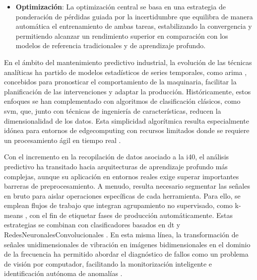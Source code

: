 \documentclass[IB]{TFUOC}
\begin{document}
\begin{itemize}
\begin{itemize}
                para realizar simultáneamente la predicción de la vida útil restante y la clasificación multietiqueta de
                fallos en equipos mecánicos a través de la captura de dependencias temporales y cruzadas entre sensores.
          \item \textbf{Optimización}: La optimización central se basa en una estrategia de ponderación de pérdidas
                guiada por la incertidumbre que equilibra de manera automática el entrenamiento de ambas tareas,
                estabilizando la convergencia y permitiendo alcanzar un rendimiento superior en comparación con los
                modelos de referencia tradicionales y de aprendizaje profundo.
        \end{itemize}
\end{itemize}

En el ámbito del mantenimiento predictivo industrial, la evolución de las técnicas analíticas ha partido de modelos
estadísticos de series temporales, como \gls{arima} \cite{kanawaday2017machine}, concebidos para pronosticar el
comportamiento de la maquinaria, facilitar la planificación de las intervenciones y adaptar la producción.
Históricamente, estos enfoques se han complementado con algoritmos de clasificación clásicos, como \gls{svm}, que,
junto con técnicas de ingeniería de características, reducen la dimensionalidad de los datos. Esta simplicidad
algorítmica resulta especialmente idónea para entornos de \gls{edgecomputing} con recursos limitados donde se requiere
un procesamiento ágil en tiempo real \cite{mian2023artificial}.

Con el incremento en la recopilación de datos asociado a la \gls{i40}, el análisis predictivo ha transitado hacia
arquitecturas de aprendizaje profundo más complejas, aunque su aplicación en entornos reales exige superar importantes
barreras de preprocesamiento. A menudo, resulta necesario segmentar las señales en bruto para aislar operaciones
específicas de cada herramienta. Para ello, se emplean flujos de trabajo que integran agrupamiento no supervisado, como
k-means \cite{kounta2023deep}, con el fin de etiquetar fases de producción automáticamente. Estas estrategias se
combinan con clasificadores basados en \gls{dt} y \gls{RedesNeuronalesConvolucionales} \cite{zufle2022machine}. En esta
misma línea, la transformación de señales unidimensionales de vibración en imágenes bidimensionales en el dominio de la
frecuencia ha permitido abordar el diagnóstico de fallos como un problema de visión por computador, facilitando la
monitorización inteligente e identificación autónoma de anomalías \cite{kounta2023deep}.
\end{document}

